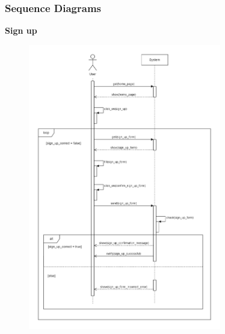 \documentclass[../RASD.tex]{subfiles}
\begin{document}
    \subsubsection{Sequence Diagrams}
    \textbf{Sign up}
    \begin{figure}[h!]
        \centering
        \includegraphics[width=0.75\textwidth]{../assets/section_3/SignUpDiagram.png}
    \end{figure}\\
    \newpage
\end{document}
